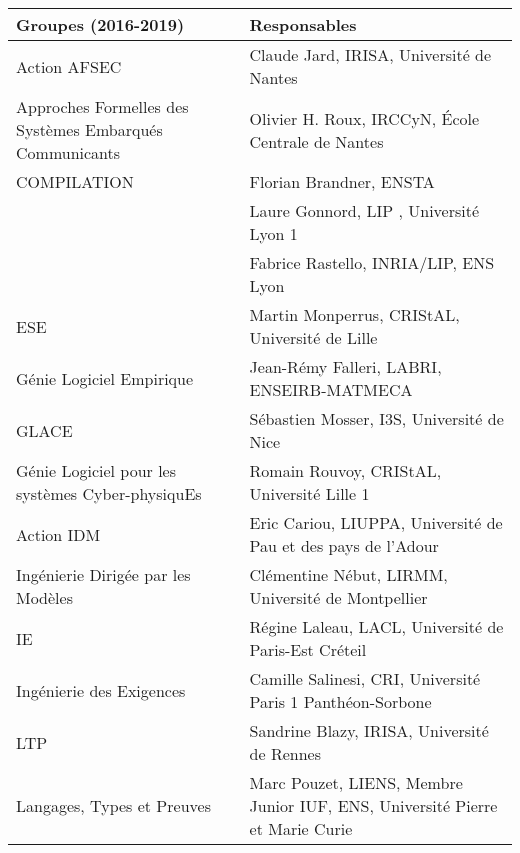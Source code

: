 \documentclass[11pt]{article}
\begin{document}
{	\centering
		\begin{tabular}{|p{6cm}p{8.5cm}|}
\hline
\bf Groupes (2016-2019) & \bf Responsables \\
\hline
\hline
Action AFSEC & Claude Jard, IRISA, Université de Nantes\\
\footnotesize Approches Formelles des Systèmes Embarqués Communicants 
             &Olivier H. Roux, IRCCyN, École Centrale de Nantes \\
\hline
COMPILATION
& Florian Brandner, ENSTA\\
& Laure Gonnord, LIP , Université Lyon 1\\
& Fabrice Rastello, INRIA/LIP, ENS Lyon \\
\hline
ESE 
& Martin Monperrus, CRIStAL, Université de Lille\\
\footnotesize Génie Logiciel Empirique
& Jean-Rémy Falleri, LABRI, ENSEIRB-MATMECA\\
\hline


GLACE 
& Sébastien Mosser, I3S, Université de Nice\\
\footnotesize Génie Logiciel pour les systèmes Cyber-physiquEs
&Romain Rouvoy, CRIStAL, Université Lille 1\\
\hline
Action IDM
& Eric Cariou, LIUPPA, Université de Pau et des pays de l'Adour\\
\footnotesize Ingénierie Dirigée par les Modèles 
& Clémentine Nébut, LIRMM, Université de Montpellier\\
\hline
IE 
& Régine Laleau, LACL, Université de Paris-Est Créteil\\
\footnotesize Ingénierie des Exigences
& Camille Salinesi, CRI, Université Paris 1 Panthéon-Sorbone\\
\hline


LTP & Sandrine Blazy, IRISA, Université de Rennes\\
\footnotesize Langages, Types et Preuves 
    & Marc Pouzet,  LIENS, Membre Junior IUF, ENS, Université Pierre et Marie Curie\\
\hline


\end{tabular}}
\end{document}
